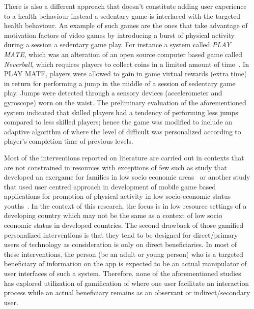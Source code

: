 There is also a different approach that doesn't constitute adding user experience to a health behaviour instead a sedentary game is interlaced with the targeted health behaviour. An example of such games are the ones that take advantage of motivation factors of video games by introducing a burst of physical activity during a session a sedentary game play. For instance a system called \emph{PLAY MATE}, which was an alteration of an open source computer based game called \emph{Neverball},  which requires players to collect coins in a limited amount of time~\citep{berkovsky2012physical}. In PLAY MATE, players were allowed to gain in game virtual rewards (extra time) in return for performing a jump in the middle of a session of sedentary game play. Jumps were detected through a sensory devices (accelerometer and gyroscope) worn on the waist. The preliminary evaluation of the aforementioned system indicated that skilled players had a tendency of performing less jumps compared to less skilled players; hence the game was modified to include an adaptive algorithm of where the level of difficult was personalized according to player's completion time of previous levels.

Most of the interventions reported on literature are carried out in contexts that are not constrained in resources with exceptions of few such as study that developed an exergame for families in low socio economic areas~\citep{saksono2015spaceship} or another study that used user centred approach in development of mobile game based applications for promotion of physical activity in low socio-economic status youths~\citep{blackman2016developing}. In the context of this research, the focus is in low resource settings of a developing country which may not be the same as a context of low socio economic status in developed countries. The second drawback of those gamified personalized interventions is that they tend to be designed for direct/primary users of technology as consideration is only on direct beneficiaries. In most of these interventions, the person (be an adult or young person) who is a targeted beneficiary of information on the app is expected to be an actual manipulator of user interfaces of such a system. Therefore, none of the aforementioned studies has explored utilization of gamification of where one user facilitate an interaction process while an actual beneficiary remains as an observant or indirect/secondary user.   



\begin{flushright}
\end{flushright}
